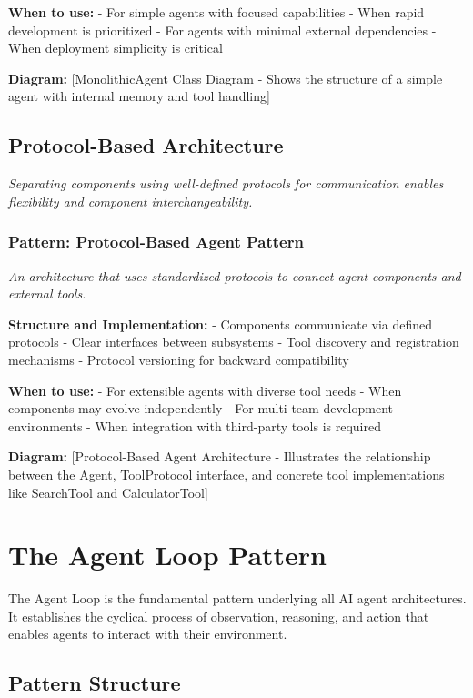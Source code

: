 \documentclass[11pt,oneside]{book}
\begin{document}
\textbf{When to use:} - For simple agents with focused capabilities -
When rapid development is prioritized - For agents with minimal external
dependencies - When deployment simplicity is critical

\textbf{Diagram:} {[}MonolithicAgent Class Diagram - Shows the structure
of a simple agent with internal memory and tool handling{]}

\subsection{Protocol-Based
Architecture}\label{protocol-based-architecture}

\emph{Separating components using well-defined protocols for
communication enables flexibility and component interchangeability.}

\subsubsection{Pattern: Protocol-Based Agent
Pattern}\label{pattern-protocol-based-agent-pattern}

\emph{An architecture that uses standardized protocols to connect agent
components and external tools.}

\textbf{Structure and Implementation:} - Components communicate via
defined protocols - Clear interfaces between subsystems - Tool discovery
and registration mechanisms - Protocol versioning for backward
compatibility

\textbf{When to use:} - For extensible agents with diverse tool needs -
When components may evolve independently - For multi-team development
environments - When integration with third-party tools is required

\textbf{Diagram:} {[}Protocol-Based Agent Architecture - Illustrates the
relationship between the Agent, ToolProtocol interface, and concrete
tool implementations like SearchTool and CalculatorTool{]}

\section{The Agent Loop Pattern}\label{the-agent-loop-pattern}

The Agent Loop is the fundamental pattern underlying all AI agent
architectures. It establishes the cyclical process of observation,
reasoning, and action that enables agents to interact with their
environment.

\subsection{Pattern Structure}\label{pattern-structure}
\end{document}
